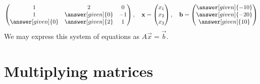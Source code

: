 \documentclass{ximera}
\begin{document}
\begin{example}
\begin{explanation}
\[\begin{pmatrix}
        1 & 2 & 0\\
        1 & \answer[given]{0} & -1 \\
        \answer[given]{0} & \answer[given]{2} & 1
      \end{pmatrix},
      \quad
      \vec{x} =
      \begin{pmatrix}
        x_1\\
        x_2\\
        x_3
      \end{pmatrix},
      \quad
      \vec{b} =
      \begin{pmatrix}
        \answer[given]{-10}\\
        \answer[given]{-20}\\
        \answer[given]{10}
      \end{pmatrix}
    \]
    We may express this system of equations as $A\vec{x} = \vec{b}$.
  \end{explanation}
\end{example}













\section{Multiplying matrices}
\end{document}
